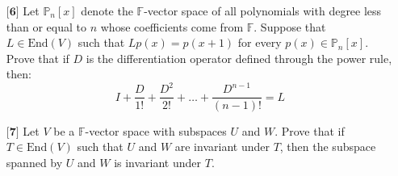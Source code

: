 \documentclass[12pt]{article}
\begin{document}
\begin{itemize}
\begin{proof}
        We see though that,
        \begin{align*}
            ST = \begin{pmatrix}
                1 & -1 \\ 1 & -1
            \end{pmatrix}\begin{pmatrix}
                1 & 1 \\ 1 & 1
            \end{pmatrix} = \begin{pmatrix}
                0 & 0 \\ 0 & 0
            \end{pmatrix} = 0
        \end{align*}
        but,
        \begin{align*}
            TS = \begin{pmatrix}
                1 & 1 \\ 1 & 1
            \end{pmatrix}\begin{pmatrix}
                1 & -1 \\ 1 & -1
            \end{pmatrix} = \begin{pmatrix}
                2 & -2 \\ 2 & -2
            \end{pmatrix} \neq ST
        \end{align*}

        So, no. If we have two linear transformation $S$ and $T$ such that $ST = 0$ it does not follow that $TS = 0$
    \end{proof}
    \vspace{.5cm}
    \item[$\textbf{[6]}$]
    Let $\mathbb{P}_n[x]$ denote the $\mathbb{F}$-vector space of all polynomials with degree less than or equal to $n$ whose coefficients come from $\mathbb{F}$. Suppose that $L \in \text{End}(V)$ such that $Lp(x) = p(x + 1)$ for every $p(x) \in \mathbb{P}_n[x]$. Prove that if $D$ is the differentiation operator defined through the power rule, then:
    \begin{equation*}
    I + \frac{D}{1!} + \frac{D^2}{2!} + \dots + \frac{D^{n-1}}{(n - 1)!} = L
    \end{equation*}
    
    \vspace{.5cm}
    \item[$\textbf{[7]}$]
    Let $V$ be a $\mathbb{F}$-vector space with subspaces $U$ and $W$. Prove that if $T \in \text{End}(V)$ such that $U$ and $W$ are invariant under $T$, then the subspace spanned by $U$ and $W$ is invariant under $T$. 


\end{itemize}
\end{document}
